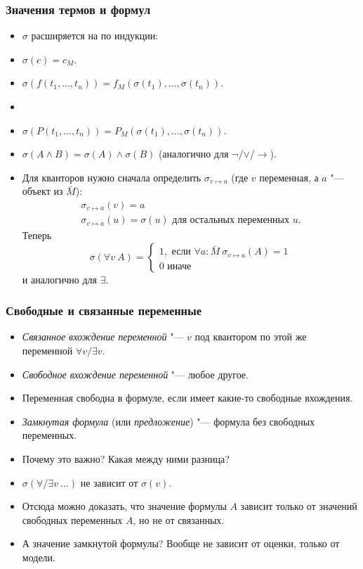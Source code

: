 \documentclass[10pt]{beamer}
\begin{document}
\begin{frame}
    \frametitle{Значения термов и формул}
    \begin{itemize}
        \item $\sigma$ расширяется на  по индукции: \pause 
        \item $\sigma(c) = c_M$.
        \item $\sigma(f(t_1,\ldots,t_n)) = f_M(\sigma(t_1),\ldots,\sigma(t_n))$.
        \pause
        \item[]
        \item $\sigma(P(t_1,\ldots,t_n)) = P_M(\sigma(t_1),\ldots,\sigma(t_n))$.
        \item $\sigma(A \land B) = \sigma(A) \land \sigma(B)$ (аналогично для $\neg$/$\lor$/$\to$).
        \pause
        \item Для кванторов нужно сначала определить $\sigma_{v \mapsto a}$ (где $v$ переменная, а $a$ "--- объект из $\bar{M}$): 
        \[ \begin{array}{l}
            \sigma_{v \mapsto a}(v) = a \\
            \sigma_{v \mapsto a}(u) = \sigma(u) \text{ для остальных переменных } u.
        \end{array} \]
        \pause
        Теперь
        \[ \sigma(\forall v ~ A) = \left\{ \begin{array}{l}
            1, \text{ если } \forall a : \bar{M} ~  \sigma_{v \mapsto a}(A) = 1 \\
            0 \text{ иначе }
        \end{array} \right. \]
        и аналогично для $\exists$.
    \end{itemize}
\end{frame}

\begin{frame}
    \frametitle{Свободные и связанные переменные}
    \begin{itemize}
        \item \emph{Связанное вхождение переменной} "--- \pause $v$ под квантором по этой же переменной $\forall v/\exists v$.
        \item \emph{Свободное вхождение переменной} "--- \pause любое другое.
        \item Переменная свободна в формуле, если имеет какие-то свободные вхождения.
        \item \emph{Замкнутая формула} (или \emph{предложение}) "--- формула без свободных переменных.
        \item Почему это важно? Какая между ними разница? \pause 
        \item $\sigma(\forall/\exists v ~ \ldots)$ не зависит от $\sigma(v)$.
        \pause
        \item Отсюда можно доказать, что значение формулы $A$ зависит только от значений свободных переменных $A$, но не от связанных.
        \pause
        \item А значение замкнутой формулы? \pause Вообще не зависит от оценки, только от модели.
    \end{itemize}
\end{frame}
\end{document}
